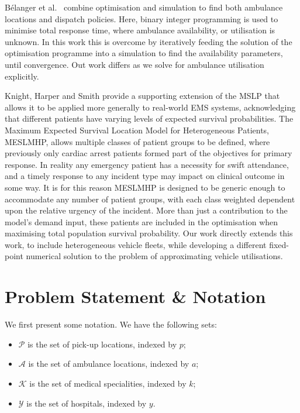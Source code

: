\documentclass[preprint,12pt]{elsarticle}
\begin{document}
Bélanger et al.~\cite{belanger20} combine optimisation and simulation to find
both ambulance locations and dispatch policies. Here, binary integer programming 
is used to minimise total response time, where ambulance availability, or
utilisation is unknown. In this work this is overcome by iteratively feeding the
solution of the optimisation programme into a simulation to find the
availability parameters, until convergence. Out work differs as we solve for
ambulance utilisation explicitly.

Knight, Harper and Smith \cite{Knight2012918} provide a supporting extension
of the MSLP that allows it to be applied more generally to real-world EMS
systems, acknowledging that different patients have varying levels of expected
survival probabilities.  The Maximum Expected Survival Location Model for
Heterogeneous Patients, MESLMHP, allows multiple classes of patient groups to
be defined, where previously only cardiac arrest patients formed part of the
objectives for primary response. In reality any emergency
patient has a necessity for swift attendance, and a timely response to any
incident type may impact on clinical outcome in some way. It is for this
reason MESLMHP is designed to be generic enough to accommodate any number of
patient groups, with each class weighted dependent upon the relative urgency
of the incident.  More than just a contribution to the model’s demand input,
these patients are included in the optimisation when maximising total
population survival probability.
Our work directly extends this work, to include heterogeneous vehicle fleets,
while developing a different fixed-point numerical solution to the problem of
approximating vehicle utilisations.


\section{Problem Statement \& Notation}\label{sec:problem_description}
We first present some notation. We have the following sets:

\begin{itemize}
  \item $\mathcal{P}$ is the set of pick-up locations, indexed by $p$;
  \item $\mathcal{A}$ is the set of ambulance locations, indexed by $a$;
  \item $\mathcal{K}$ is the set of medical specialities, indexed by $k$;
  \item $\mathcal{Y}$ is the set of hospitals, indexed by $y$.
\end{itemize}
\end{document}
